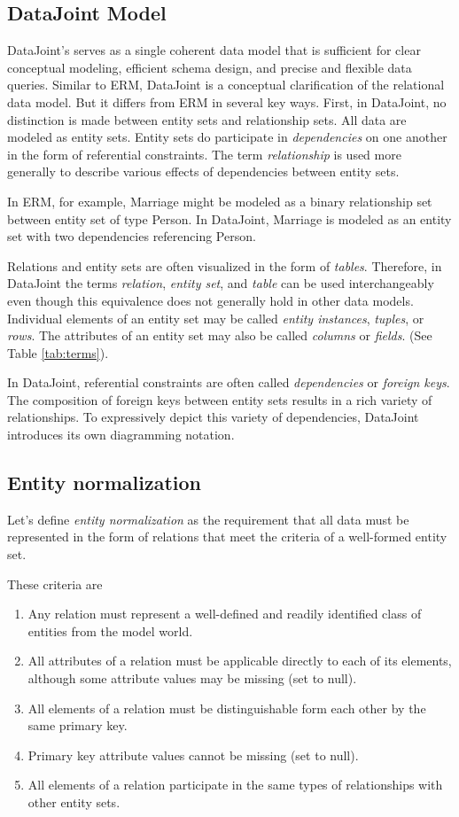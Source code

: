 \documentclass[letter,10pt]{article}
\newcommand{\datajoint}{DataJoint\xspace}
\begin{document}
\subsection{DataJoint Model}
\datajoint's serves as a single coherent data model that is sufficient for clear conceptual modeling, efficient schema design, and precise and flexible data queries. 
Similar to ERM, \datajoint is a conceptual clarification of the relational data model.  
But it differs from ERM in several key ways. 
First, in \datajoint, no distinction is made between entity sets and relationship sets.  All data are modeled as entity sets.
Entity sets do participate in \emph{dependencies} on one another in the form of referential constraints.  The term \emph{relationship} is used more generally to describe various  effects of dependencies between entity sets.

In ERM, for example, Marriage might be modeled as a binary relationship set between entity set of type Person.  In \datajoint, Marriage is modeled as an entity set with two dependencies referencing Person. 

Relations and entity sets are often visualized in the form of \emph{tables}. 
Therefore, in \datajoint the terms \emph{relation}, \emph{entity set}, and \emph{table} can be used interchangeably even though this equivalence does not generally hold in other data models. 
Individual elements of an entity set may be called \emph{entity instances}, \emph{tuples}, or \emph{rows}.
The attributes of an entity set may also be called \emph{columns} or \emph{fields}. (See Table \ref{tab:terms}).

In \datajoint, referential constraints are often called \emph{dependencies} or \emph{foreign keys}.  
The composition of foreign keys between entity sets results in a rich variety of relationships. 
To expressively depict this variety of dependencies, \datajoint introduces its own diagramming notation.


\subsection{Entity normalization}\label{sec:norm}
Let's define \emph{entity normalization} as the requirement that all data must be represented in the form of relations that meet the criteria of a well-formed entity set.

These criteria are
\begin{enumerate}
\item Any relation must represent a well-defined and readily identified class of entities from the model world.
\item All attributes of a relation must be applicable directly to each of its elements, although some attribute values may be missing (set to null).  
\item All elements of a relation must be distinguishable form each other by the same primary key.
\item Primary key attribute values cannot be missing (set to null).
\item All elements of a relation participate in the same types of relationships with other entity sets.
\end{enumerate}
\end{document}
